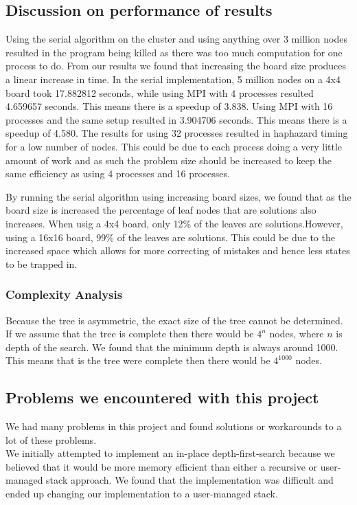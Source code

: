 \documentclass[a4paper]{article}
\begin{document}
\subsection{Discussion on performance of results}
Using the serial algorithm on the cluster and using anything over 3 million nodes resulted in the program being killed as there was too much computation for one process to do. From our results we found that increasing the board size produces a linear increase in time. In the serial implementation, 5 million nodes on a 4x4 board took 17.882812 seconds, while using MPI with 4 processes resulted 4.659657 seconds. This means there is a speedup of 3.838. Using MPI with 16 processes and the same setup resulted in 3.904706 seconds. This means there is a speedup of 4.580.
The results for using 32 processes resulted in haphazard timing for a low number of nodes. This could be due to each process doing a very little amount of work and as such the problem size should be increased to keep the same efficiency as using 4 processes and 16 processes. 

By running the serial algorithm using increasing board sizes, we found that as the board size is increased the percentage of leaf nodes that are solutions also increases. When usig a 4x4 board, only 12\% of the leaves are solutions.However, using a 16x16 board, 99\% of the leaves are solutions. This could be due to the increased space which allows for more correcting of mistakes and hence less states to be trapped in.

\subsubsection{Complexity Analysis}
Because the tree is asymmetric, the exact size of the tree cannot be determined. If we assume that the tree is complete then there would be $4^n$ nodes, where $n$ is depth of the search. We found that the minimum depth is always around 1000. This means that is the tree were complete then there would be $4^1000$ nodes. 

\subsection{Problems we encountered with this project}
We had many problems in this project and found solutions or workarounds to a lot of these problems.\\

We initially attempted to implement an in-place depth-first-search because we believed that it would be more memory efficient than either a recursive or user-managed stack approach. We found that the implementation was difficult and ended up changing our implementation to a user-managed stack.\\
\end{document}
